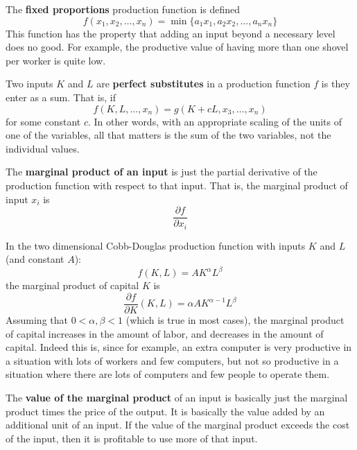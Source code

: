 \documentclass{article}
\begin{document}
    \begin{definition}
      The \textbf{fixed proportions} production function is defined
      \[f(x_1, x_2, \ldots, x_n) = \min \{a_1 x_1, a_2 x_2, \ldots, a_n x_n\}\]
      This function has the property that adding an input beyond a necessary level does no good. For example, the productive value of having more than one shovel per worker is quite low. 
    \end{definition}

    \begin{definition}
      Two inputs $K$ and $L$ are \textbf{perfect substitutes} in a production function $f$ is they enter as a sum. That is, if 
      \[f(K, L, \ldots, x_n) = g(K + c L, x_3, \ldots, x_n)\]
      for some constant $c$. In other words, with an appropriate scaling of the units of one of the variables, all that matters is the sum of the two variables, not the individual values. 
    \end{definition}

    \begin{definition}
      The \textbf{marginal product of an input} is just the partial derivative of the production function with respect to that input. That is, the marginal product of input $x_i$ is
      \[\frac{\partial f}{\partial x_i} \]
    \end{definition}

    \begin{example}
      In the two dimensional Cobb-Douglas production function with inputs $K$ and $L$ (and constant $A$):  
      \[f (K, L) = A K^\alpha L^\beta\]
      the marginal product of capital $K$ is 
      \[\frac{\partial f}{\partial K} (K, L) = \alpha A K^{\alpha-1} L^\beta\]
      Assuming that $0 < \alpha, \beta < 1$ (which is true in most cases), the marginal product of capital increases in the amount of labor, and decreases in the amount of capital. Indeed this is, since for example, an extra computer is very productive in a situation with lots of workers and few computers, but not so productive in a situation where there are lots of computers and few people to operate them. 

      The \textbf{value of the marginal product} of an input is basically just the marginal product times the price of the output. It is basically the value added by an additional unit of an input. If the value of the marginal product exceeds the cost of the input, then it is profitable to use more of that input. 
    \end{example}
\end{document}
